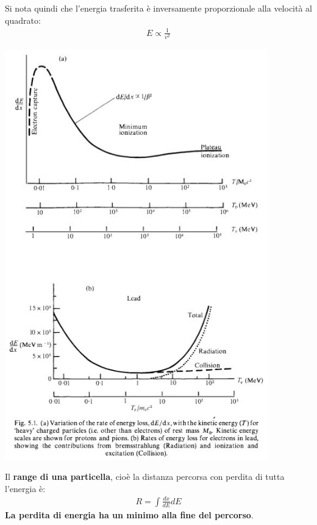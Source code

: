 \documentclass[a4paper,11pt,twoside,openany]{book}
\theoremstyle{definition}
\theoremstyle{plain}
\theoremstyle{plain}
\theoremstyle{definition}
\begin{document}
Si nota quindi che l'energia trasferita è inversamente proporzionale alla velocità al quadrato:
\begin{equation}\begin{split}
E\propto \frac{1}{v^2}
\end{split}\end{equation}

\begin{center}
\includegraphics[width=4.5in]{immagini/stopping_power.jpg} %
\end{center}

Il \textbf{range di una particella}, cioè la distanza percorsa con perdita di tutta l'energia è:
\begin{equation}\begin{split}
R=\int{\frac{dx}{dE}dE}
\end{split}\end{equation}
\textbf{La perdita di energia ha un minimo alla fine del percorso}.
\end{document}
